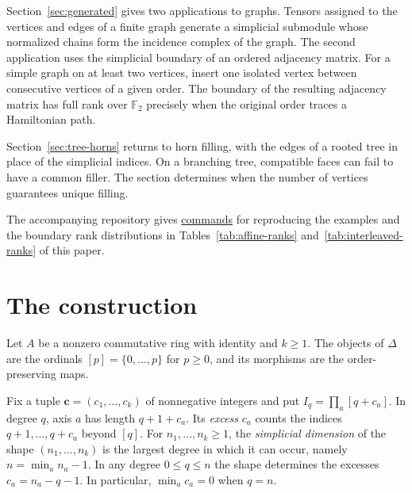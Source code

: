 \documentclass[11pt]{article}
\theoremstyle{definition}
\theoremstyle{remark}
\begin{document}
Section~\ref{sec:generated} gives two applications to graphs.
Tensors assigned to the vertices and edges of a finite graph generate a simplicial submodule whose normalized chains form the incidence complex of the graph.
The second application uses the simplicial boundary of an ordered adjacency matrix.
For a simple graph on at least two vertices, insert one isolated vertex between consecutive vertices of a given order.
The boundary of the resulting adjacency matrix has full rank over $\mathbb F_2$ precisely when the original order traces a Hamiltonian path.

Section~\ref{sec:tree-horns} returns to horn filling, with the edges of a rooted tree in place of the simplicial indices.
On a branching tree, compatible faces can fail to have a common filler.
The section determines when the number of vertices guarantees unique filling.

The accompanying repository \cite{SimplicialTensors} gives \href{https://github.com/flengyel/SimplicialTensors/blob/c6802c6692215b688864dc18cd9ff3073b804d71/tex/README.md#reproduce-the-calculations}{commands} for reproducing the examples and the boundary rank distributions in Tables~\ref{tab:affine-ranks} and~\ref{tab:interleaved-ranks} of this paper.

\section{The construction}\label{sec:construction}
Let $A$ be a nonzero commutative ring with identity and $k\geq1$. The objects of
$\Delta$ are the ordinals $[p]=\{0,\ldots,p\}$ for $p\geq0$, and its morphisms are the order-preserving maps.

Fix a tuple $\mathbf c=(c_1,\ldots,c_k)$ of nonnegative integers and put $I_q=\prod_a[q+c_a]$.
In degree $q$, axis $a$ has length $q+1+c_a$. Its \emph{excess} $c_a$
counts the indices $q+1,\ldots,q+c_a$ beyond $[q]$.
For $n_1,\ldots,n_k\geq1$, the \emph{simplicial dimension} of the shape
$(n_1,\ldots,n_k)$ is the
largest degree in which it can occur, namely $n=\min_a n_a-1$.
In any degree $0\leq q\leq n$ the shape determines the excesses
$c_a=n_a-q-1$. In particular, $\min_a c_a=0$ when $q=n$.
\end{document}
